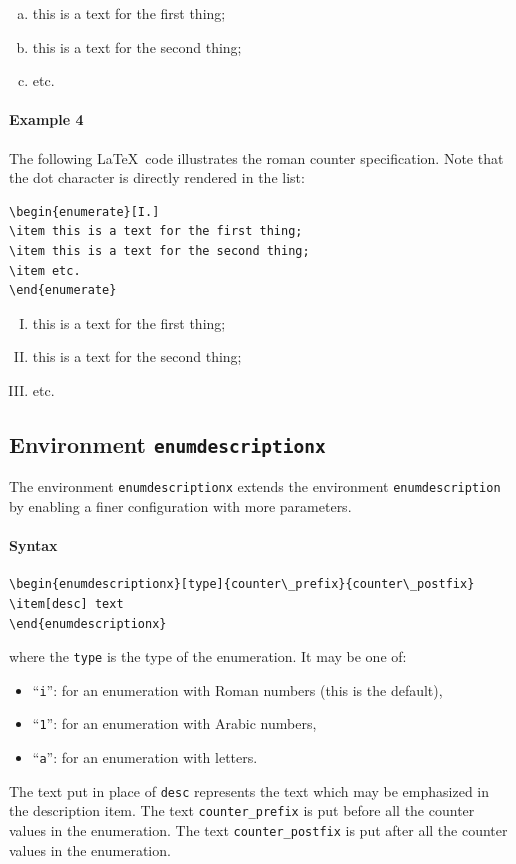 \documentclass[book,taskpackage,specpackage,codepackage]{upmethodology-document}
\begin{document}
\begin{enumerate}[(a)]
\item this is a text for the first thing;
\item this is a text for the second thing;
\item etc.
\end{enumerate}

\paragraph{Example 4} The following \LaTeX~code illustrates the roman counter specification. Note that the dot character is directly rendered in the list:
\begin{verbatim}
\begin{enumerate}[I.]
\item this is a text for the first thing;
\item this is a text for the second thing;
\item etc.
\end{enumerate}
\end{verbatim}

\begin{enumerate}[I.]
\item this is a text for the first thing;
\item this is a text for the second thing;
\item etc.
\end{enumerate}

\subsection{Environment \texttt{enumdescriptionx}}

The environment \texttt{enumdescriptionx} extends the environment \texttt{enumdescription} by enabling a finer configuration with more parameters.

\paragraph{Syntax}
\begin{verbatim}
\begin{enumdescriptionx}[type]{counter\_prefix}{counter\_postfix}
\item[desc] text
\end{enumdescriptionx}
\end{verbatim}
where the \texttt{type} is the type of the enumeration. It may be one of:
\begin{itemize}
\item ``\texttt{i}'': for an enumeration with Roman numbers (this is the default),
\item ``\texttt{1}'': for an enumeration with Arabic numbers,
\item ``\texttt{a}'': for an enumeration with letters.
\end{itemize}
The text put in place of \texttt{desc} represents the text which may be emphasized in the description item.
The text \texttt{counter\_prefix} is put before all the counter values in the enumeration.
The text \texttt{counter\_postfix} is put after all the counter values in the enumeration.
\end{document}
